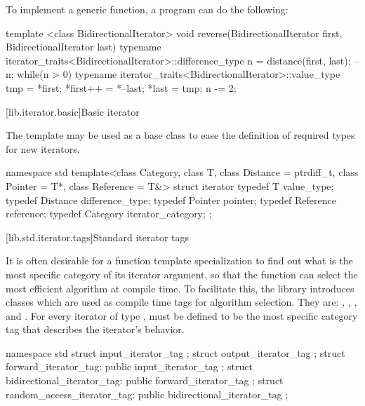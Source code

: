 \pnum
\enterexample
To implement a generic
function, a \Cpp program can do the following:

\begin{codeblock}
template <class BidirectionalIterator>
void reverse(BidirectionalIterator first, BidirectionalIterator last) {
   typename iterator_traits<BidirectionalIterator>::difference_type n =
         distance(first, last);
   --n;
   while(n > 0) {
       typename iterator_traits<BidirectionalIterator>::value_type
                tmp = *first;
       *first++ = *--last;
       *last = tmp;
       n -= 2;
   }
}
\end{codeblock}
\exitexampleb

[lib.iterator.basic]{Basic iterator}

\pnum
The
template may be used as a base class to ease the definition of required types
for new iterators.

\begin{codeblock}
namespace std {
  template<class Category, class T, class Distance = ptrdiff_t,
           class Pointer = T*, class Reference = T&>
  struct iterator {
        typedef T         value_type;
        typedef Distance  difference_type;
        typedef Pointer   pointer;
        typedef Reference reference;
        typedef Category  iterator_category;
  };
}
\end{codeblock}

[lib.std.iterator.tags]{Standard iterator tags}

\pnum
{}%
%
%
%
%
It is often desirable for a
function template specialization
to find out what is the most specific category of its iterator
argument, so that the function can select the most efficient algorithm at compile time.
To facilitate this, the
library introduces
classes which are used as compile time tags for algorithm selection.
They are:
,
,
,
and
.
For every iterator of type
,
must be defined to be the most specific category tag that describes the
iterator's behavior.

\begin{codeblock}
namespace std {
  struct input_iterator_tag {};
  struct output_iterator_tag {};
  struct forward_iterator_tag: public input_iterator_tag {};
  struct bidirectional_iterator_tag: public forward_iterator_tag {};
  struct random_access_iterator_tag: public bidirectional_iterator_tag {};
}
\end{codeblock}

